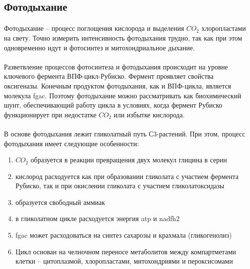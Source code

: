 \subsection*{Фотодыхание}

\paragraph*{}Фотодыхание – процесс поглощения кислорода и выделения $CO_{2}$ хлоропластами на свету. Точно измерить интенсивность фотодыхания трудно, так как при этом одновременно идут и фотосинтез и митохондриальное дыхание. 

\paragraph*{}Разветвление процессов фотосинтеза и фотодыхания происходит на уровне ключевого фермента ВПФ-цикл-Рубиско. Фермент проявляет свойства оксигеназы. Конечным продуктом фотодыхания, как и ВПФ-цикла, является молекула \gls{fgac}. Поэтому фотодыхание можно рассматривать как биохимический шунт, обеспечивающий работу цикла в условиях, когда фермент Рубиско функционирует при недостатке $CO_{2}$ или избытке кислорода.

\paragraph*{}В основе фотодыхания лежит гликолатный путь С3-растений. При этом, процесс фотодыхания имеет следующие особенности: 

\begin{enumerate}
	\item $CO_{2}$ образуется в реакции превращения двух молекул глицина в серин
	\item кислород расходуется как при образовании гликолата с участием фермента Рубиско, так и при окислении гликолата с участием гликолатоксидазы
	\item образуется свободный аммиак
	\item в гликолатном цикле расходуется энергия \gls{atp} и \gls{nadfh2}
	\item \gls{fgac} может расходоваться на синтез сахарозы и крахмала (гликогенолиз)
	\item Цикл основан на челночном переносе метаболитов между компартметами клетки – цитоплазмой, хлоропластами, митохондриями и пероксисомами
	
\end{enumerate}

